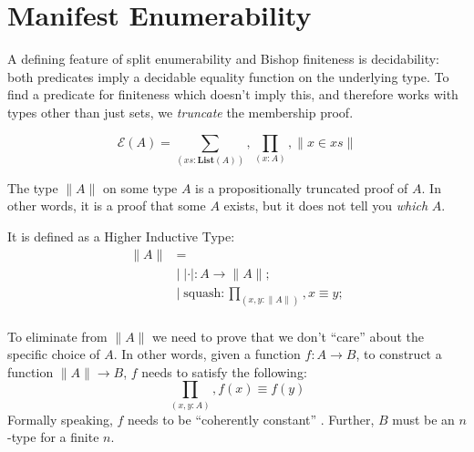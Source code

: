 \section{Manifest Enumerability} \label{manifest-enumerability}
A defining feature of split enumerability and Bishop finiteness is decidability:
both predicates imply a decidable equality function on the underlying type.
To find a predicate for finiteness which doesn't imply this, and therefore
works with types other than just sets, we \emph{truncate} the membership proof.
\begin{rm-definition}
  \begin{equation}
    \mathcal{E}(A) = \sum_{(\mathit{xs} : \mathbf{List}(A))} , \prod_{(x : A)} , \lVert x \in \mathit{xs} \rVert
  \end{equation}
\end{rm-definition}
\begin{rm-definition}
  The type \(\lVert A \rVert\) on some type \(A\) is a propositionally truncated
  proof of \(A\).
  In other words, it is a proof that some \(A\) exists, but it does not tell you
  \emph{which} \(A\).

  It is defined as a Higher Inductive Type:
  \begin{equation}
    \begin{aligned}
      \lVert A \rVert &= \\
        &| \; \lvert \cdot \rvert : A \rightarrow \lVert A \rVert ; \\
        &| \; \text{squash} : \prod_{(x, y : \lVert A \rVert)} , x \equiv y  ; \\
    \end{aligned}
  \end{equation}

  To eliminate from \(\lVert A \rVert\) we need to prove that we don't ``care''
  about the specific choice of \(A\).
  In other words, given a function \(f : A \rightarrow B\), to construct a
  function \(\lVert A \rVert \rightarrow B\), \(f\) needs to satisfy the following:
  \begin{equation}
    \prod_{(x , y : A)} , f(x) \equiv f(y)
  \end{equation}
  Formally speaking, \(f\) needs to be ``coherently constant''
  \cite{krausGeneralUniversalProperty2015}.
  Further, \(B\) must be an \(n\)-type for a finite \(n\).
\end{rm-definition}
